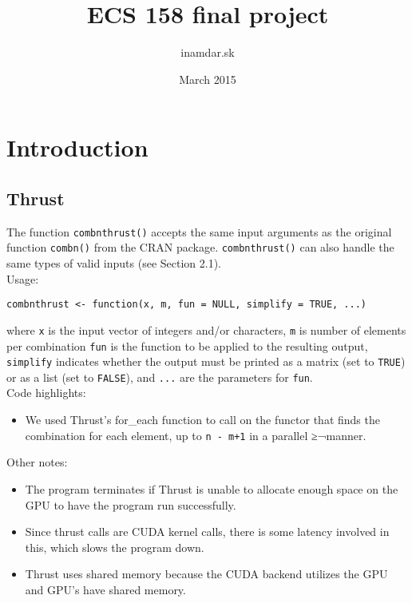 \documentclass{article}
\title{ECS 158 final project}
\author{inamdar.sk }
\date{March 2015}
\begin{document}
\maketitle

\section{Introduction}

\subsection{Thrust}

The function \texttt{combnthrust()} accepts the same input arguments as the original function \texttt{combn()} from the CRAN package. \texttt{combnthrust()} can also handle the same types of valid inputs (see Section 2.1).\\
\null
Usage:\\
\null

\texttt{combnthrust <- function(x, m, fun = NULL, simplify = TRUE, ...)}\\
\null

where \texttt{x} is the input vector of integers and/or characters, \texttt{m} is number of elements per combination
\texttt{fun} is the function to be applied to the resulting output, \texttt{simplify} indicates whether the output must be printed as a matrix (set to \texttt{TRUE}) or as a list (set to \texttt{FALSE}), and \texttt{...} are the parameters for \texttt{fun}.\\

\null
Code highlights:\\
\begin{itemize}
\item We used Thrust's  for\_each function to call on the functor that finds the combination for each element, up to \texttt{n - m+1} in a parallel ≥¬manner. 
\end{itemize}
Other notes:
\begin{itemize}
\item The program terminates if Thrust is unable to allocate enough space on the GPU to have the program run successfully. 
\item Since thrust calls are CUDA kernel calls, there is some latency involved in this, which slows the program down. 
\item Thrust uses shared memory because the CUDA backend utilizes the GPU and GPU's have shared memory. 
\end{itemize}
\end{document}
